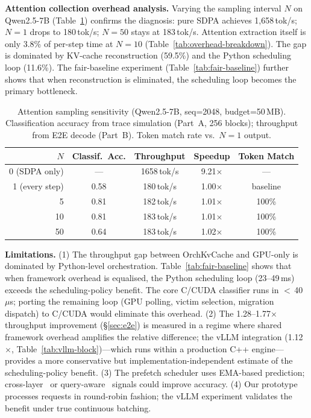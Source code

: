 \documentclass[conference]{IEEEtran}
\begin{document}
\textbf{Attention collection overhead analysis.}
Varying the sampling interval $N$ on Qwen2.5-7B (Table~\ref{tab:sampling}) confirms the diagnosis: pure SDPA achieves 1,658\,tok/s; $N{=}1$ drops to 180\,tok/s; $N{=}50$ stays at 183\,tok/s.  Attention extraction itself is only 3.8\% of per-step time at $N{=}10$ (Table~\ref{tab:overhead-breakdown}).  The gap is dominated by KV-cache reconstruction (59.5\%) and the Python scheduling loop (11.6\%).  The fair-baseline experiment (Table~\ref{tab:fair-baseline}) further shows that when reconstruction is eliminated, the scheduling loop becomes the primary bottleneck.

\begin{table}[t]
\centering
\caption{Attention sampling sensitivity (Qwen2.5-7B, seq=2048, budget=50\,MB). Classification accuracy from trace simulation (Part~A, 256 blocks); throughput from E2E decode (Part~B). Token match rate vs.\ $N{=}1$ output.}
\label{tab:sampling}
\small
\begin{tabular}{@{}rcccc@{}}
\toprule
$N$ & Classif.\ Acc. & Throughput & Speedup & Token Match \\
\midrule
0 (SDPA only) & --- & 1658\,tok/s & 9.21$\times$ & --- \\
1 (every step) & 0.58 & 180\,tok/s & 1.00$\times$ & baseline \\
5 & 0.81 & 182\,tok/s & 1.01$\times$ & 100\% \\
10 & 0.81 & 183\,tok/s & 1.01$\times$ & 100\% \\
50 & 0.64 & 183\,tok/s & 1.02$\times$ & 100\% \\
\bottomrule
\end{tabular}
\end{table}

\textbf{Limitations.} (1) The throughput gap between OrchKvCache and GPU-only is dominated by Python-level orchestration.  Table~\ref{tab:fair-baseline} shows that when framework overhead is equalised, the Python scheduling loop (23--49\,ms) exceeds the scheduling-policy benefit.  The core C/CUDA classifier runs in $<$\,40\,$\mu$s; porting the remaining loop (GPU polling, victim selection, migration dispatch) to C/CUDA would eliminate this overhead.  (2) The 1.28--1.77$\times$ throughput improvement (\S\ref{sec:e2e}) is measured in a regime where shared framework overhead amplifies the relative difference; the vLLM integration (1.12$\times$, Table~\ref{tab:vllm-block})---which runs within a production C++ engine---provides a more conservative but implementation-independent estimate of the scheduling-policy benefit.  (3) The prefetch scheduler uses EMA-based prediction; cross-layer~\cite{infinigen} or query-aware~\cite{quest} signals could improve accuracy.  (4) Our prototype processes requests in round-robin fashion; the vLLM experiment validates the benefit under true continuous batching.
\end{document}
